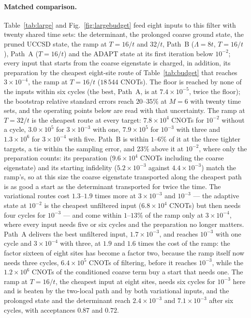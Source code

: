 \documentclass[a4paper,11pt,noarxiv]{quantumarticle}
\begin{document}
\paragraph{Matched comparison.}
Table~\ref{tab:large} and Fig.~\ref{fig:largebudget} feed eight inputs to
this filter with twenty shared time sets: the determinant, the prolonged
coarse ground state, the pruned UCCSD state, the ramp at $T=16/t$ and
$32/t$, Path~B ($\Lambda=8t$, $T=16/t$), Path~A ($T=16/t$) and the ADAPT
state at its first iteration below $10^{-2}$; every input that starts from
the coarse eigenstate is charged, in addition, its preparation by the
cheapest eight-site route of Table~\ref{tab:budget} that reaches
$3\times10^{-4}$, the ramp at $T=16/t$ ($18\,544$ CNOTs).  The floor is
reached by none of the inputs within six cycles (the best, Path~A, is at
$7.4\times10^{-5}$, twice the floor); the bootstrap relative standard errors
reach $20$--$35\%$ at $M=6$ with twenty time sets, and the operating points
below are read with that uncertainty.  The ramp at $T=32/t$ is the cheapest
route at every target: $7.8\times10^4$ CNOTs for $10^{-2}$ without a
cycle, $3.0\times10^5$ for $3\times10^{-3}$ with one, $7.9\times10^5$ for
$10^{-3}$ with three and $1.3\times10^6$ for $3\times10^{-4}$ with five.
Path~B is within $1$--$6\%$ of it at the three tighter targets, a tie
within the sampling error, and $23\%$ above it at $10^{-2}$, where only the
preparation counts: its preparation ($9.6\times10^4$ CNOTs including the
coarse eigenstate) and its starting infidelity ($5.2\times10^{-3}$ against
$4.4\times10^{-3}$) match the ramp's, so at this size the coarse eigenstate
transported along the cheapest path is as good a start as the determinant
transported for twice the time.  The variational routes cost $1.3$--$1.9$
times more at $3\times10^{-3}$ and $10^{-3}$ --- the adaptive state at
$10^{-2}$ is the cheapest unfiltered input ($6.8\times10^4$ CNOTs) but then
needs four cycles for $10^{-3}$ --- and come within $1$--$13\%$ of the
ramp only at $3\times10^{-4}$, where every input needs five or six cycles
and the preparation no longer matters.  Path~A delivers the best unfiltered input,
$1.7\times10^{-3}$, and reaches $10^{-3}$ with one cycle and
$3\times10^{-4}$ with three, at $1.9$ and $1.6$ times the cost of the ramp:
the factor sixteen of eight sites has become a factor two, because the
ramp itself now needs three cycles, $6.4\times10^5$ CNOTs of filtering,
before it reaches $10^{-3}$, while the $1.2\times10^6$ CNOTs of the
conditioned coarse term buy a start that needs one.  The ramp at $T=16/t$, the cheapest input
at eight sites, needs six cycles for $10^{-3}$ here and is beaten by the
two-local path and by both variational inputs, and the prolonged state and the determinant
reach $2.4\times10^{-3}$ and $7.1\times10^{-3}$ after six cycles, with
acceptances $0.87$ and $0.72$.
\end{document}
